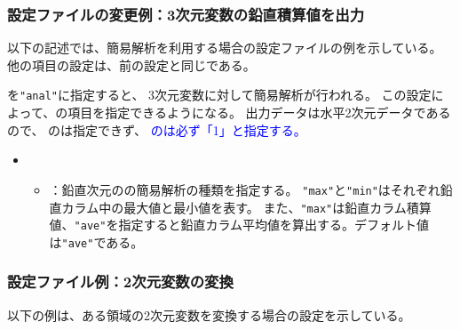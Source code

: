 \subsubsection{設定ファイルの変更例：3次元変数の鉛直積算値を出力}
以下の記述では、簡易解析を利用する場合の設定ファイルの例を示している。
他の項目の設定は、前の設定と同じである。

を\verb|"anal"|に指定すると、
3次元変数に対して簡易解析が行われる。
この設定によって、の項目を指定できるようになる。
出力データは水平2次元データであるので、
のは指定できず、
\textcolor{blue}{のは必ず「1」と指定する。}

\begin{itemize}
 \item {}
 \begin{itemize}
  \item {}：鉛直次元のの簡易解析の種類を指定する。
  \verb|"max"|と\verb|"min"|はそれぞれ鉛直カラム中の最大値と最小値を表す。
  また、\verb|"max"|は鉛直カラム積算値、\verb|"ave"|を指定すると鉛直カラム平均値を算出する。デフォルト値は\verb|"ave"|である。
 \end{itemize}
\end{itemize}

\subsubsection{設定ファイル例：2次元変数の変換}
\label{subsec:net2g_2d}
以下の例は、ある領域の2次元変数を変換する場合の設定を示している。


